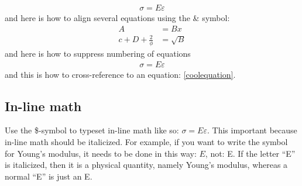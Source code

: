 \begin{align}
\sigma = E\varepsilon \label{coolequation}
\end{align}
and here is how to align several equations using the \& symbol:
\begin{align}
A &= Bx \\ %
c + D +\frac{2}{\phi} &= \sqrt{B}
\end{align}
and here is how to suppress numbering of equations
\begin{align*}
\sigma = E\varepsilon
\end{align*}
and this is how to cross-reference to an equation: \cref{coolequation}.

\subsection{In-line math}
Use the \$-symbol to typeset in-line math like so: $\sigma = E\varepsilon$. This important because in-line math should be italicized. For example, if you want to write the symbol for Young's modulus, it needs to be done in this way: $E$, not: E. If the letter ``E'' is italicized, then it is a physical quantity, namely Young's modulus, whereas a normal ``E'' is just an E.